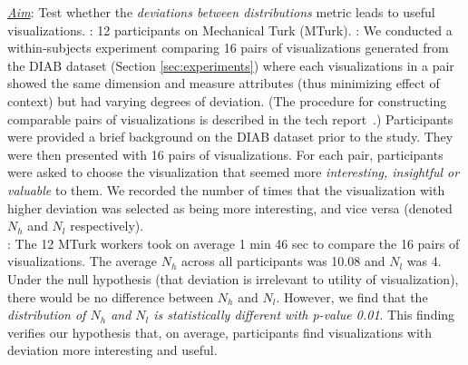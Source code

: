 {\it \underline{Aim}}: Test whether the {\it deviations between distributions} metric leads to useful visualizations.
: 12 participants on Mechanical Turk (MTurk).
: 
We conducted a within-subjects experiment comparing 16 pairs of visualizations generated 
from the DIAB dataset (Section \ref{sec:experiments}) 
where each visualizations in a pair showed the same dimension and measure attributes (thus minimizing effect of context) but had varying degrees of deviation. 
(The procedure for constructing comparable pairs of visualizations is described in the tech report~\cite{seedb-tr}.)
Participants were provided a brief background on the DIAB dataset prior to the study.
They were then presented with 16 pairs of visualizations. 
For each pair, participants were asked to choose the visualization that seemed more {\it interesting, insightful or valuable} to them.
We recorded the number of times that the visualization with higher deviation was selected as being more interesting, and vice versa (denoted $N_h$ and $N_l$ respectively).
\\
: The 12 MTurk workers took on average 
1 min 46 sec to compare the 16 pairs of visualizations.
The average $N_h$ across all participants was 10.08 and $N_l$ was 4.
Under the null hypothesis (that deviation is irrelevant to utility of visualization),
there would be no difference between $N_{h}$ and $N_{l}$.
However, we find that the {\em distribution of $N_{h}$ and $N_{l}$ is statistically different with
p-value 0.01}.
This finding verifies our hypothesis that, on average, participants 
find visualizations with deviation more interesting and useful.



